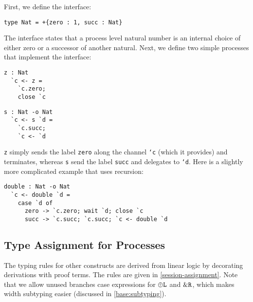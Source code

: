 First, we define the interface:

\begin{lstlisting}[language=krill, style=custom]
  type Nat = +{zero : 1, succ : Nat}
\end{lstlisting}

The interface states that a process level natural number is an internal choice of either zero or a successor of another natural. Next, we define two simple processes that implement the interface:

\begin{minipage}{.48\textwidth}
\begin{lstlisting}[language=krill, style=custom]
  z : Nat
  `c <- z =
    `c.zero;
    close `c
\end{lstlisting}
\end{minipage}
\hfill
\begin{minipage}{.48\textwidth}
\begin{lstlisting}[language=krill, style=custom]
  s : Nat -o Nat
  `c <- s `d =
    `c.succ;
    `c <- `d
\end{lstlisting}
\end{minipage}

\texttt{z} simply sends the label \texttt{zero} along the channel \texttt{`c} (which it provides) and terminates, whereas \texttt{s} send the label \texttt{succ} and delegates to \texttt{`d}. Here is a slightly more complicated example that uses recursion:

\begin{lstlisting}[language=krill, style=custom]
  double : Nat -o Nat
  `c <- double `d =
    case `d of
      zero -> `c.zero; wait `d; close `c
      succ -> `c.succ; `c.succ; `c <- double `d
\end{lstlisting}


\subsection{Type Assignment for Processes}
\label{base:type-assignment}

The typing rules for other constructs are derived from linear logic by decorating derivations with proof terms. The rules are given in \cref{session-assignment}. Note that we allow unused branches case expressions for $\oplus\texttt{L}$ and $\&\texttt{R}$, which makes width subtyping easier (discussed in \cref{base:subtyping}).

